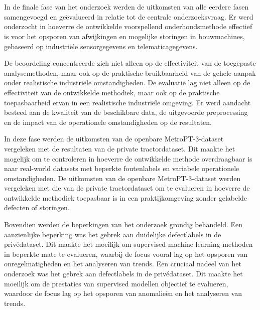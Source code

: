 \newpage

\section{}%
\label{sec:Evaluatie en conclusie}

In de finale fase van het onderzoek werden de uitkomsten van alle eerdere fasen samengevoegd en geëvalueerd in relatie tot de centrale onderzoeksvraag. Er werd onderzocht in hoeverre de ontwikkelde voorspellend onderhoudsmethode effectief is voor het opsporen van afwijkingen en mogelijke storingen in bouwmachines, gebaseerd op industriële sensorgegevens en telematicagegevens.

De beoordeling concentreerde zich niet alleen op de effectiviteit van de toegepaste analysemethoden, maar ook op de praktische bruikbaarheid van de gehele aanpak onder realistische industriële omstandigheden. De evaluatie lag niet alleen op de effectiviteit van de ontwikkelde methodiek, maar ook op de praktische toepasbaarheid ervan in een realistische industriële omgeving. Er werd aandacht besteed aan de kwaliteit van de beschikbare data, de uitgevoerde preprocessing en de impact van de operationele omstandigheden op de resultaten.

In deze fase werden de uitkomsten van de openbare MetroPT-3-dataset vergeleken met de resultaten van de private tractordataset. Dit maakte het mogelijk om te controleren in hoeverre de ontwikkelde methode overdraagbaar is naar real-world datasets met beperkte foutenlabels en variabele operationele omstandigheden. De uitkomsten van de openbare MetroPT-3-dataset werden vergeleken met die van de private tractordataset om te evalueren in hoeverre de ontwikkelde methodiek toepasbaar is in een praktijkomgeving zonder gelabelde defecten of storingen.

Bovendien werden de beperkingen van het onderzoek grondig behandeld. Een aanzienlijke beperking was het gebrek aan duidelijke defectlabels in de privédataset. Dit maakte het moeilijk om supervised machine learning-methoden in beperkte mate te evalueren, waarbij de focus vooral lag op het opsporen van onregelmatigheden en het analyseren van trends. Een cruciaal nadeel van het onderzoek was het gebrek aan defectlabels in de privédataset. Dit maakte het moeilijk om de prestaties van supervised modellen objectief te evalueren, waardoor de focus lag op het opsporen van anomalieën en het analyseren van trends.

